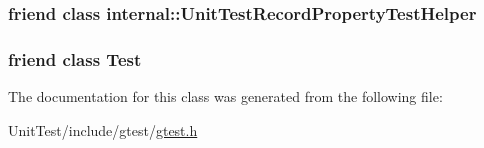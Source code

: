 \hypertarget{classtesting_1_1_unit_test_ae970f89a9f477a349fe5778be85ef42e}{
\subsubsection[{internal\+::\+Unit\+Test\+Record\+Property\+Test\+Helper}]{\setlength{\rightskip}{0pt plus 5cm}friend class internal\+::\+Unit\+Test\+Record\+Property\+Test\+Helper\hspace{0.3cm}{\ttfamily [friend]}}}\label{classtesting_1_1_unit_test_ae970f89a9f477a349fe5778be85ef42e}
\hypertarget{classtesting_1_1_unit_test_a5b78b1c2e1fa07ffed92da365593eaa4}{
\subsubsection[{Test}]{\setlength{\rightskip}{0pt plus 5cm}friend class {\bf Test}\hspace{0.3cm}{\ttfamily [friend]}}}\label{classtesting_1_1_unit_test_a5b78b1c2e1fa07ffed92da365593eaa4}


The documentation for this class was generated from the following file\+:\begin{DoxyCompactItemize}
\item 
Unit\+Test/include/gtest/\hyperlink{gtest_8h}{gtest.\+h}\end{DoxyCompactItemize}
